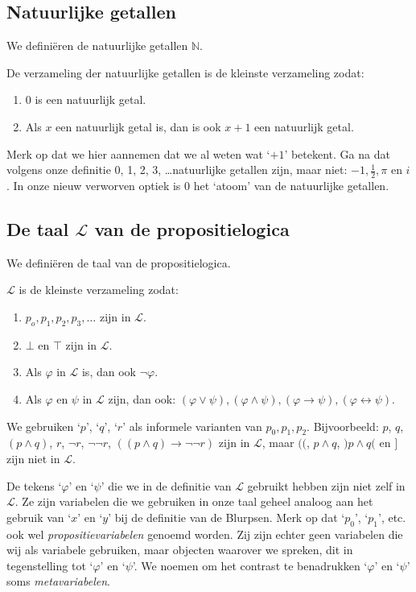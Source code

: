 \subsection*{Natuurlijke getallen}
We defini\"eren de natuurlijke getallen $\mathbb{N}$.
\begin{definition}
De verzameling der natuurlijke getallen is de kleinste verzameling zodat:
\begin{enumerate}[label=\roman*.]
    \item 0 is een natuurlijk getal.
    \item Als $x$ een natuurlijk getal is, dan is ook $x+1$ een natuurlijk getal.
\end{enumerate}
\end{definition}
Merk op dat we hier aannemen dat we al weten wat `$+1$' betekent. Ga na dat volgens onze definitie 0, 1, 2, 3, \ldots natuurlijke getallen zijn, maar niet: $-1, \frac{1}{2}, \pi$ en $i$. In onze nieuw verworven optiek is 0 het `atoom' van de natuurlijke getallen.

\subsection*{De taal $\mathcal{L}$ van de propositielogica}
We defini\"eren de taal van de propositielogica.
\begin{definition}
$\mathcal{L}$ is de kleinste verzameling zodat:
\begin{enumerate}[label=\roman*.]
    \item $p_o,p_1,p_2,p_3,\ldots$ zijn in $\mathcal{L}$.
    \item $\bot$ en $\top$ zijn in $\mathcal{L}$.
    \item Als $\varphi$ in $\mathcal{L}$ is, dan ook $\neg\varphi$.
    \item Als $\varphi$ en $\psi$ in $\mathcal{L}$ zijn, dan ook: $(\varphi\vee\psi), (\varphi\wedge\psi),(\varphi\rightarrow\psi),(\varphi\leftrightarrow\psi)$.
\end{enumerate}
\end{definition}
We gebruiken `$p$', `$q$', `$r$' als informele varianten van $p_0, p_1, p_2$. Bijvoorbeeld: $p$, $q$, $(p\wedge q)$, $r$, $\neg r$, $\neg\neg r$, $((p\wedge q)\rightarrow\neg\neg r)$ zijn in $\mathcal{L}$, maar $(($, $p\wedge q$, $)p\wedge q($ en $]$ zijn niet in $\mathcal{L}$.

De tekens `$\varphi$' en `$\psi$' die we in de definitie van $\mathcal{L}$ gebruikt hebben zijn niet zelf in $\mathcal{L}$. Ze zijn variabelen die we gebruiken in onze taal geheel analoog aan het gebruik van `$x$' en `$y$' bij de definitie van de Blurpsen. Merk op dat `$p_0$', `$p_1$', etc. ook wel \textit{propositievariabelen} genoemd worden. Zij zijn echter geen variabelen die wij als variabele gebruiken, maar objecten waarover we spreken, dit in tegenstelling tot `$\varphi$' en `$\psi$'. We noemen om het contrast te benadrukken `$\varphi$' en `$\psi$' soms \textit{metavariabelen}.

